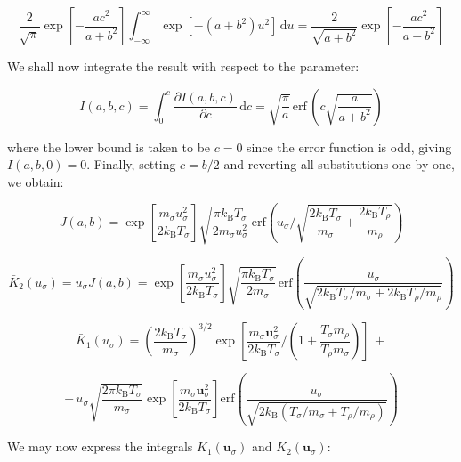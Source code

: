 \begin{equation}
    \frac{2}{\sqrt{\pi}}\exp{\left[-\frac{ac^2}{a+b^2}\right]}\int_{-\infty}^\infty\exp{\left[-(a+b^2)u^2\right]}\,\mathrm{d}u=\frac{2}{\sqrt{a+b^2}}\exp{\left[-\frac{ac^2}{a+b^2}\right]}
\end{equation}

We shall now integrate the result with respect to the parameter:

\begin{equation}
    I(a,b,c)=\int_0^c\frac{\partial I(a,b,c)}{\partial c}\,\mathrm{d}c=\sqrt{\frac{\pi}{a}}\,\text{erf}\,\left(c\sqrt{\frac{a}{a+b^2}}\right)
\end{equation}

where the lower bound is taken to be $c=0$ since the error function is odd, giving $I(a,b,0)=0$. Finally, setting $c=b/2$ and reverting all substitutions one by one, we obtain:

\begin{equation}
    J(a,b)=\exp{\left[\frac{m_\sigma u_\sigma^2}{2k_\mathrm{B}T_\sigma}\right]}\sqrt{\frac{\pi k_\mathrm{B}T_\sigma}{2m_\sigma u_\sigma^2}}\,\text{erf}\left(u_\sigma\bigg/\sqrt{\frac{2k_\mathrm{B}T_\sigma}{m_\sigma}+\frac{2k_\mathrm{B}T_\rho}{m_\rho}}\right)
\end{equation}

\begin{equation}
    \label{eq-fokker-78}
    \bar{K}_2(u_\sigma)=u_\sigma J(a,b)=\exp{\left[\frac{m_\sigma u_\sigma^2}{2k_\mathrm{B}T_\sigma}\right]}\sqrt{\frac{\pi k_\mathrm{B}T_\sigma}{2m_\sigma}}\,\text{erf}\left(\frac{u_\sigma}{\sqrt{2k_\mathrm{B}T_\sigma/m_\sigma+2k_\mathrm{B}T_\rho/m_\rho}}\right)
\end{equation}

\begin{equation}
    \bar{K}_1(u_\sigma)=\left(\frac{2k_\mathrm{B}T_\sigma}{m_\sigma}\right)^{3/2}\exp{\left[\frac{m_\sigma\mathbf{u}_\sigma^2}{2k_\mathrm{B}T_\sigma}\bigg/\left(1+\frac{T_\sigma m_\rho}{T_\rho m_\sigma}\right)\right]}\,+
\end{equation}

\begin{equation}
    +\,u_\sigma\sqrt{\frac{2\pi k_\mathrm{B}T_\sigma}{m_\sigma}}\exp{\left[\frac{m_\sigma\mathbf{u}_\sigma^2}{2k_\mathrm{B}T_\sigma}\right]}\text{erf}\left(\frac{u_\sigma}{\sqrt{2k_\mathrm{B}(T_\sigma/m_\sigma+T_\rho/m_\rho)}}\right)
\end{equation}

We may now express the integrals $K_1(\mathbf{u}_\sigma)$ and $K_2(\mathbf{u}_\sigma)$:

